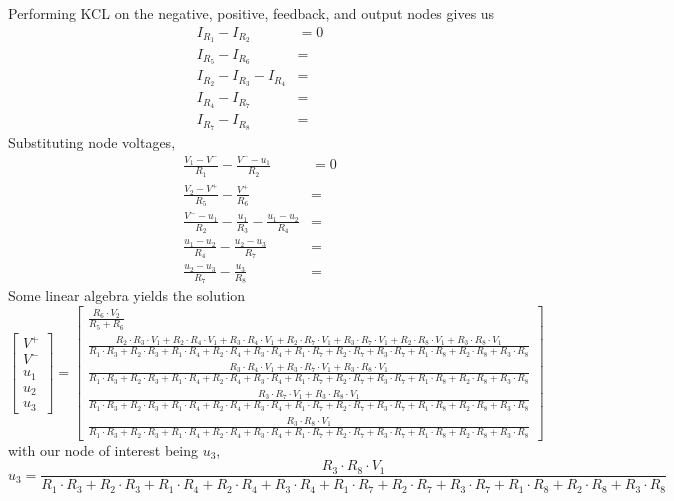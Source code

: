 \documentclass[]{article}
\begin{document}
Performing KCL on the negative, positive, feedback, and output nodes gives us
\begin{align}
	I_{R_1} - I_{R_2} &= 0 \\
	I_{R_5} - I_{R_6} &= \\
	I_{R_2} - I_{R_3} - I_{R_4} &= \\
	I_{R_4} - I_{R_7} &= \\
	I_{R_7} - I_{R_8} &=
\end{align}
Substituting node voltages, 
\begin{align}
	\frac{V_1 - V^-}{R_1} - \frac{V^- - u_1}{R_2} &= 0 \\
	\frac{V_2 - V^+}{R_5} - \frac{V^+}{R_6} &= \\
	\frac{V^- - u_1}{R_2} - \frac{u_1}{R_3} - \frac{u_1 - u_2}{R_4} &= \\
	\frac{u_1 - u_2}{R_4} - \frac{u_2 - u_3}{R_7} &= \\
	\frac{u_2 - u_3}{R_7} - \frac{u_3}{R_8} &=
\end{align}
Some linear algebra yields the solution
\begin{equation}
	\begin{bmatrix}
	V^+ \\
	V^- \\
	u_1 \\
	u_2 \\
	u_3
	\end{bmatrix}
	=
	\begin{bmatrix}
	\frac{R_6 \cdot V_2}{R_5+R_6} \\
	\frac{R_2 \cdot R_3 \cdot V_1+R_2 \cdot R_4 \cdot V_1+R_3 \cdot R_4 \cdot V_1+R_2 \cdot R_7 \cdot V_1+R_3 \cdot R_7 \cdot V_1+R_2 \cdot R_8 \cdot V_1+R_3 \cdot R_8 \cdot V_1}{R_1 \cdot R_3+R_2 \cdot R_3+R_1 \cdot R_4+R_2 \cdot R_4+R_3 \cdot R_4+R_1 \cdot R_7+R_2 \cdot R_7+R_3 \cdot R_7+R_1 \cdot R_8+R_2 \cdot R_8+R_3 \cdot R_8} \\
	\frac{R_3 \cdot R_4 \cdot V_1+R_3 \cdot R_7 \cdot V_1+R_3 \cdot R_8 \cdot V_1}{R_1 \cdot R_3+R_2 \cdot R_3+R_1 \cdot R_4+R_2 \cdot R_4+R_3 \cdot R_4+R_1 \cdot R_7+R_2 \cdot R_7+R_3 \cdot R_7+R_1 \cdot R_8+R_2 \cdot R_8+R_3 \cdot R_8} \\
	\frac{R_3 \cdot R_7 \cdot V_1+R_3 \cdot R_8 \cdot V_1}{R_1 \cdot R_3+R_2 \cdot R_3+R_1 \cdot R_4+R_2 \cdot R_4+R_3 \cdot R_4+R_1 \cdot R_7+R_2 \cdot R_7+R_3 \cdot R_7+R_1 \cdot R_8+R_2 \cdot R_8+R_3 \cdot R_8} \\
	\frac{R_3 \cdot R_8 \cdot V_1}{R_1 \cdot R_3+R_2 \cdot R_3+R_1 \cdot R_4+R_2 \cdot R_4+R_3 \cdot R_4+R_1 \cdot R_7+R_2 \cdot R_7+R_3 \cdot R_7+R_1 \cdot R_8+R_2 \cdot R_8+R_3 \cdot R_8}
	\end{bmatrix}
\end{equation}
with our node of interest being \(u_3\), 
{\small
\begin{equation}
	u_3 = \frac{R_3 \cdot R_8 \cdot V_1}{R_1 \cdot R_3+R_2 \cdot R_3+R_1 \cdot R_4+R_2 \cdot R_4+R_3 \cdot R_4+R_1 \cdot R_7+R_2 \cdot R_7+R_3 \cdot R_7+R_1 \cdot R_8+R_2 \cdot R_8+R_3 \cdot R_8}
\end{equation}}
\end{document}
